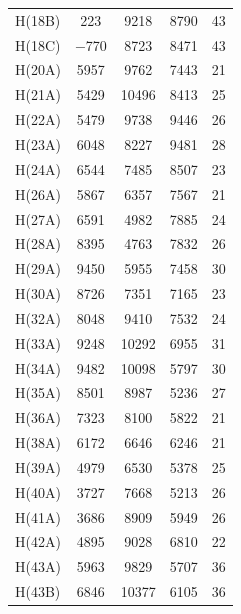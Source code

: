 \begin{center}
{\begin{supertabular}{lcccc}
H(18B)&223&9218&8790&43\\
H(18C)&$-$770&8723&8471&43\\
H(20A)&5957&9762&7443&21\\
H(21A)&5429&10496&8413&25\\
H(22A)&5479&9738&9446&26\\
H(23A)&6048&8227&9481&28\\
H(24A)&6544&7485&8507&23\\
H(26A)&5867&6357&7567&21\\
H(27A)&6591&4982&7885&24\\
H(28A)&8395&4763&7832&26\\
H(29A)&9450&5955&7458&30\\
H(30A)&8726&7351&7165&23\\
H(32A)&8048&9410&7532&24\\
H(33A)&9248&10292&6955&31\\
H(34A)&9482&10098&5797&30\\
H(35A)&8501&8987&5236&27\\
H(36A)&7323&8100&5822&21\\
H(38A)&6172&6646&6246&21\\
H(39A)&4979&6530&5378&25\\
H(40A)&3727&7668&5213&26\\
H(41A)&3686&8909&5949&26\\
H(42A)&4895&9028&6810&22\\
H(43A)&5963&9829&5707&36\\
H(43B)&6846&10377&6105&36\\
\end{supertabular}
}
\end{center}

